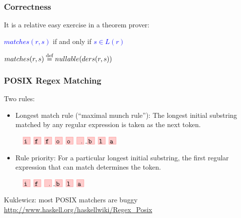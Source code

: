 \documentclass[dvipsnames,14pt,t]{beamer}
\newcommand{\bl}[1]{\textcolor{blue}{#1}}
\begin{document}
\begin{frame}[c]
\frametitle{Correctness}

It is a relative easy exercise in a theorem prover:

\begin{center}
\bl{$matches(r, s)$}  if and only if  \bl{$s \in L(r)$} 
\end{center}\bigskip

\small
\bl{$matches(r, s) \stackrel{\mbox{\scriptsize def}}{=} nullable(ders(r, s))$}

\end{frame}

\begin{frame}[c]
\frametitle{POSIX Regex Matching}

Two rules:

\begin{itemize}
\item Longest match rule (``maximal munch rule''): The 
longest initial substring matched by any regular expression 
is taken as the next token.

\begin{center}
\bl{$\texttt{\Grid{iffoo\VS bla}}$}
\end{center}\medskip

\item Rule priority:
For a particular longest initial substring, the first regular
expression that can match determines the token.

\begin{center}
\bl{$\texttt{\Grid{if\VS bla}}$}
\end{center}
\end{itemize}\bigskip\pause

\small
\hfill Kuklewicz: most POSIX matchers are buggy\\
\footnotesize
\hfill \url{http://www.haskell.org/haskellwiki/Regex_Posix}

\end{frame}
\end{document}
